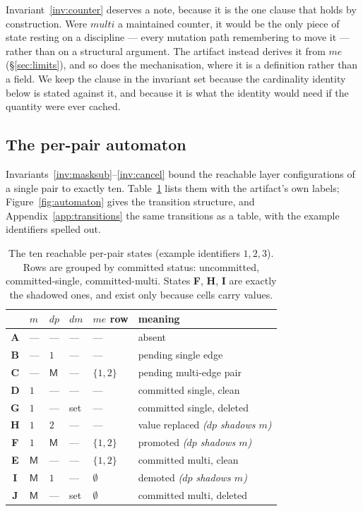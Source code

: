 \documentclass[11pt,a4paper]{article}
\theoremstyle{plain}
\theoremstyle{definition}
\theoremstyle{remark}
\newcommand{\M}{\mathsf{M}}
\begin{document}
Invariant~\ref{inv:counter} deserves a note, because it is the one clause that
holds by construction. Were $\textit{multi}$ a maintained counter, it would be
the only piece of state resting on a discipline --- every mutation path
remembering to move it --- rather than on a structural argument. The artifact
instead derives it from $me$ (\S\ref{sec:limits}), and so does the
mechanisation, where it is a definition rather than a field. We keep the clause
in the invariant set because the cardinality identity below is stated against
it, and because it is what the identity would need if the quantity were ever
cached.

\subsection{The per-pair automaton}
\label{sec:automaton}

Invariants~\ref{inv:masksub}--\ref{inv:cancel} bound the reachable layer
configurations of a single pair to exactly ten. Table~\ref{tab:states} lists
them with the artifact's own labels; Figure~\ref{fig:automaton} gives the
transition structure, and Appendix~\ref{app:transitions} the same transitions
as a table, with the example identifiers spelled out.

\begin{table}[t]
\centering
\small
\begin{tabular}{@{}clllll@{}}
\toprule
 & $m$ & $dp$ & $dm$ & $me$ row & meaning \\
\midrule
\textbf{A} & --- & --- & --- & --- & absent \\
\textbf{B} & --- & $1$ & --- & --- & pending single edge \\
\textbf{C} & --- & $\M$ & --- & $\{1,2\}$ & pending multi-edge pair \\
\midrule
\textbf{D} & $1$ & --- & --- & --- & committed single, clean \\
\textbf{G} & $1$ & --- & set & --- & committed single, deleted \\
\textbf{H} & $1$ & $2$ & --- & --- & value replaced \hfill\emph{($dp$ shadows $m$)} \\
\textbf{F} & $1$ & $\M$ & --- & $\{1,2\}$ & promoted \hfill\emph{($dp$ shadows $m$)} \\
\midrule
\textbf{E} & $\M$ & --- & --- & $\{1,2\}$ & committed multi, clean \\
\textbf{I} & $\M$ & $1$ & --- & $\emptyset$ & demoted \hfill\emph{($dp$ shadows $m$)} \\
\textbf{J} & $\M$ & --- & set & $\emptyset$ & committed multi, deleted \\
\bottomrule
\end{tabular}
\caption{The ten reachable per-pair states (example identifiers $1,2,3$).
Rows are grouped by committed status: uncommitted, committed-single,
committed-multi. States \textbf{F}, \textbf{H}, \textbf{I} are exactly the
shadowed ones, and exist only because cells carry values.}
\label{tab:states}
\end{table}
\end{document}
